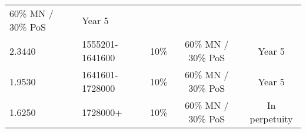 \documentclass[11pt,a4paperpaper,]{report}
\begin{document}
\begin{longtable}[]{@{}llccc@{}}
\begin{minipage}[t]{0.24\columnwidth}
60\% MN / 30\% PoS\strut
\end{minipage} & \begin{minipage}[t]{0.12\columnwidth}\centering\strut
Year 5\strut
\end{minipage}\tabularnewline
\begin{minipage}[t]{0.12\columnwidth}\raggedright\strut
2.3440\strut
\end{minipage} & \begin{minipage}[t]{0.19\columnwidth}\raggedright\strut
1555201-1641600\strut
\end{minipage} & \begin{minipage}[t]{0.14\columnwidth}\centering\strut
10\%\strut
\end{minipage} & \begin{minipage}[t]{0.24\columnwidth}\centering\strut
60\% MN / 30\% PoS\strut
\end{minipage} & \begin{minipage}[t]{0.12\columnwidth}\centering\strut
Year 5\strut
\end{minipage}\tabularnewline
\begin{minipage}[t]{0.12\columnwidth}\raggedright\strut
1.9530\strut
\end{minipage} & \begin{minipage}[t]{0.19\columnwidth}\raggedright\strut
1641601-1728000\strut
\end{minipage} & \begin{minipage}[t]{0.14\columnwidth}\centering\strut
10\%\strut
\end{minipage} & \begin{minipage}[t]{0.24\columnwidth}\centering\strut
60\% MN / 30\% PoS\strut
\end{minipage} & \begin{minipage}[t]{0.12\columnwidth}\centering\strut
Year 5\strut
\end{minipage}\tabularnewline
\begin{minipage}[t]{0.12\columnwidth}\raggedright\strut
1.6250\strut
\end{minipage} & \begin{minipage}[t]{0.19\columnwidth}\raggedright\strut
1728000+\strut
\end{minipage} & \begin{minipage}[t]{0.14\columnwidth}\centering\strut
10\%\strut
\end{minipage} & \begin{minipage}[t]{0.24\columnwidth}\centering\strut
60\% MN / 30\% PoS\strut
\end{minipage} & \begin{minipage}[t]{0.12\columnwidth}\centering\strut
In perpetuity\strut
\end{minipage}\tabularnewline
\bottomrule
\end{longtable}
\end{document}
